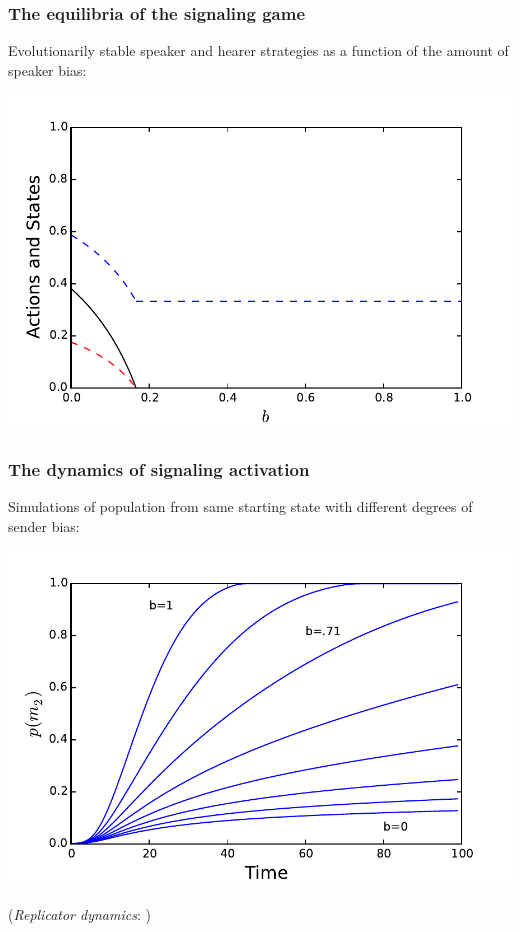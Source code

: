 \documentclass[compress]{beamer}
\begin{document}
\begin{frame}
\frametitle{The equilibria of the signaling game}
Evolutionarily stable speaker and hearer strategies as a function of the amount of speaker bias:
	\begin{center}
		\includegraphics[width=.7\textwidth]{sol2-beta.pdf}
	\end{center}
\end{frame}


\begin{frame}
\frametitle{The dynamics of signaling activation}
Simulations of population from same starting state with different degrees of sender bias:
	\begin{center}
		\includegraphics[width=.75\textwidth]{replicator-multiple-b-eps-converted-to.pdf}
	\end{center}
	\vfill \hfill \footnotesize{(\emph{Replicator dynamics}: \cite{taylor-jonker:1978,borgers-sarin1997})}
\end{frame}
\end{document}
